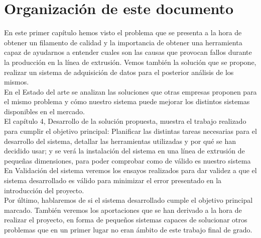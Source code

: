 \section{Organización de este documento}
\label{sec:organizacion}

En este primer capítulo hemos visto el problema que se presenta a la hora de obtener un filamento de calidad y la importancia de obtener una herramienta capaz de ayudarnos a entender cuales son las causas que provocan fallos durante la producción en la línea de extrusión. Vemos también la solución que se propone, realizar un sistema de adquisición de datos para el posterior análisis de los mismos.\\

En el Estado del arte se analizan las soluciones que otras empresas proponen para el mismo problema y cómo nuestro sistema puede mejorar los distintos sistemas disponibles en el mercado.\\

El capítulo 4, Desarrollo de la solución propuesta, muestra el trabajo realizado para cumplir el objetivo principal: Planificar las distintas tareas necesarias para el desarrollo del sistema, detallar las herramientas utilizadas y por qué se han decidido usar; y se verá la instalación del sistema en una línea de extrusión de pequeñas dimensiones, para poder comprobar como de válido es nuestro sistema\\

En Validación del sistema veremos los ensayos realizados para dar validez a que el sistema desarrollado es válido para minimizar el error presentado en la introducción del proyecto.\\

Por último, hablaremos de si el sistema desarrollado cumple el objetivo principal marcado. También veremos los aportaciones que se han derivado a la hora de realizar el proyecto, en forma de pequeños sistemas capaces de solucionar otros problemas que en un primer lugar no eran ámbito de este trabajo final de grado.\\